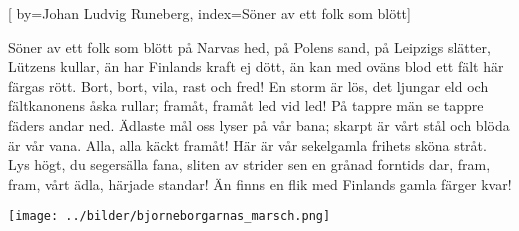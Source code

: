 

[
by={Johan Ludvig Runeberg},
index={Söner av ett folk som blött}]

\beginverse*
Söner av ett folk som blött
på Narvas hed, på Polens sand, på Leipzigs slätter, Lützens kullar,
än har Finlands kraft ej dött,
än kan med oväns blod ett fält här färgas rött.
Bort, bort, vila, rast och fred!
En storm är lös, det ljungar eld och fältkanonens åska rullar;
framåt, framåt led vid led!
På tappre män se tappre fäders andar ned.
Ädlaste mål
oss lyser på vår bana;
skarpt är vårt stål
och blöda är vår vana.
Alla, alla käckt framåt!
Här är vår sekelgamla frihets sköna stråt.
Lys högt, du segersälla fana,
sliten av strider sen en grånad forntids dar,
fram, fram, vårt ädla, härjade standar!
Än finns en flik med Finlands gamla färger kvar!
\endverse
\endsong

\begin{intersong}
\begin{center}
\texttt{[image: ../bilder/bjorneborgarnas\_marsch.png]} 
\end{center}
\end{intersong}

